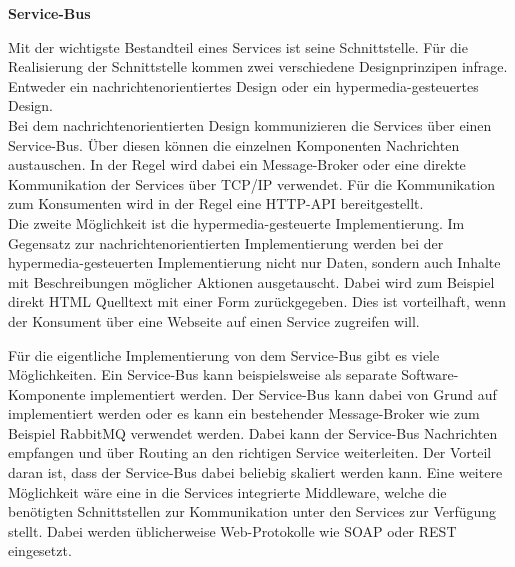 \textbf{Service-Bus}

Mit der wichtigste Bestandteil eines Services ist seine Schnittstelle. Für die Realisierung der Schnittstelle kommen zwei verschiedene Designprinzipen infrage. Entweder ein nachrichtenorientiertes Design oder ein hypermedia-gesteuertes Design.\\
Bei dem nachrichtenorientierten Design kommunizieren die Services über einen Service-Bus. Über diesen können die einzelnen Komponenten Nachrichten austauschen. In der Regel wird dabei ein Message-Broker oder eine direkte Kommunikation der Services über TCP/IP verwendet. Für die Kommunikation zum Konsumenten wird in der Regel eine HTTP-API bereitgestellt.\\
Die zweite Möglichkeit ist die hypermedia-gesteuerte Implementierung. Im Gegensatz zur nachrichtenorientierten Implementierung werden bei der hypermedia-gesteuerten Implementierung nicht nur Daten, sondern auch Inhalte mit Beschreibungen möglicher Aktionen ausgetauscht. Dabei wird zum Beispiel direkt HTML Quelltext mit einer Form zurückgegeben. Dies ist vorteilhaft, wenn der Konsument über eine Webseite auf einen Service zugreifen will. \cite{NADAREISHVILI.2016}

Für die eigentliche Implementierung von dem Service-Bus gibt es viele Möglichkeiten. Ein Service-Bus kann beispielsweise als separate Software-Komponente implementiert werden. Der Service-Bus kann dabei von Grund auf implementiert werden oder es kann ein bestehender Message-Broker wie zum Beispiel RabbitMQ verwendet werden. Dabei kann der Service-Bus Nachrichten empfangen und über Routing an den richtigen Service weiterleiten. Der Vorteil daran ist, dass der Service-Bus dabei beliebig skaliert werden kann. Eine weitere Möglichkeit wäre eine in die Services integrierte Middleware, welche die benötigten Schnittstellen zur Kommunikation unter den Services zur Verfügung stellt. Dabei werden üblicherweise Web-Protokolle wie SOAP oder REST eingesetzt. \cite{Heutschi.2007}






